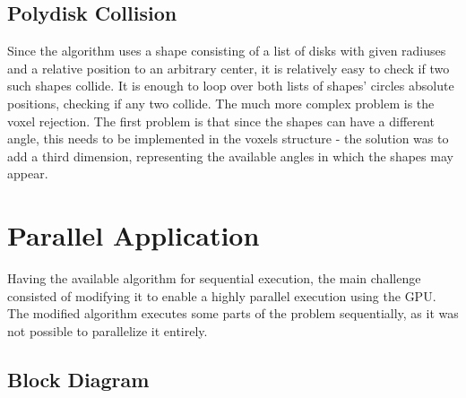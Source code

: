 \documentclass[12pt, oneside]{report}
\begin{document}
\subsection{Polydisk Collision}

Since the algorithm uses a shape consisting of a list of disks with given radiuses and a relative position to an arbitrary center, it is relatively easy to check if two such shapes collide. It is enough to loop over both lists of shapes' circles absolute positions, checking if any two collide. \newline
The much more complex problem is the voxel rejection. The first problem is that since the shapes can have a different angle, this needs to be implemented in the voxels structure - the solution was to add a third dimension, representing the available angles in which the shapes may appear.



\section {Parallel Application}

Having the available algorithm for sequential execution, the main challenge consisted of modifying it to enable a highly parallel execution using the GPU. The modified algorithm executes some parts of the problem sequentially, as it was not possible to parallelize it entirely.

\subsection{Block Diagram}
\end{document}
